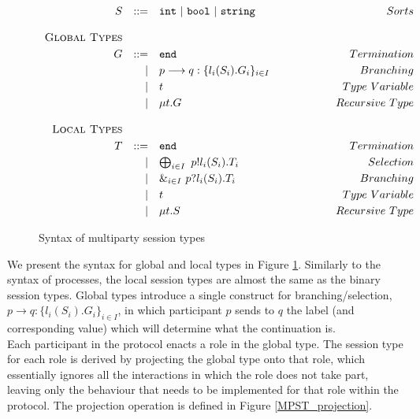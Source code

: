 \documentclass[12pt,twoside]{report}
\newcommand{\white}{\ \ \ \ \ \ \ \ \ \ \ \ }
\begin{document}
\begin{figure}[h]
    \centering
    \begin{equation*}
    \centering
    \begin{array}{rrlcr}
        S & ::= & \texttt{int}\ |\ \texttt{bool}\ |\ \texttt{string}& \white & Sorts\\\\
        \textsc{Global\ Types} & && &\\[3pt]
        G & ::= & \texttt{end} & \white & Termination  \\[2.75pt]
             & | & p \longrightarrow q: \{l_i( S_i).G_i\}_{i \in I} & \white & Branching \\[2.75pt] 
             & | & t & \white & Type\ Variable \\[2.75pt]
             & | & \mu t.G & \white & Recursive\ Type\\\\
             
        \textsc{Local Types} &&&& \\[3pt]
        T & ::= & \texttt{end} & \white & Termination  \\[2.75pt]
          & | & \bigoplus_{i \in I}\ p!l_i(S_i).T_i & \white& Selection \\[2.75pt]
          & | & \&_{i \in I}\ p?l_i(S_i).T_i & \white & Branching \\[2.75pt] 
          & | & t & \white & Type\ Variable \\[2.75pt]
          & | & \mu t.S & \white & Recursive\ Type
        
        \end{array}
    \end{equation*}
    \caption{Syntax of multiparty session types}
    \label{MPST_types}
\end{figure}{}

We present the syntax for global and local types in Figure \ref{MPST_types}. Similarly to the syntax of processes, the local session types are almost the same as the binary session types. Global types introduce a single construct for branching/selection, $p \longrightarrow q:\{l_i(S_i).G_i\}_{i \in I}$, in which participant $p$ sends to $q$ the label (and corresponding value) which will determine what the continuation is.\\

Each participant in the protocol enacts a role in the global type. The session type for each role is derived by projecting the global type onto that role, which essentially ignores all the interactions in which the role does not take part, leaving only the behaviour that needs to be implemented for that role within the protocol. The projection operation is defined in Figure \ref{MPST_projection}.\\
\end{document}

